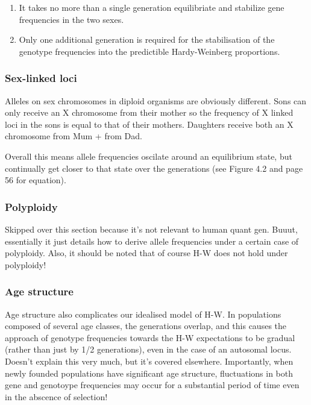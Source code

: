 \documentclass[
]{article}
\providecommand{\tightlist}{%
  \setlength{\itemsep}{0pt}\setlength{\parskip}{0pt}}
\begin{document}
\begin{enumerate}
\def\labelenumi{\arabic{enumi}.}
\tightlist
\item
  It takes no more than a single generation equilibriate and stabilize
  gene frequencies in the two sexes.
\item
  Only one additional generation is required for the stabilisation of
  the genotype frequencies into the predictible Hardy-Weinberg
  proportions.
\end{enumerate}

\hypertarget{sex-linked-loci}{%
\subsubsection{Sex-linked loci}\label{sex-linked-loci}}

Alleles on sex chromosomes in diploid organisms are obviously different.
Sons can only receive an X chromosome from their mother so the frequency
of X linked loci in the sons is equal to that of their mothers.
Daughters receive both an X chromosome from Mum + from Dad.

Overall this means allele frequencies oscilate around an equilibrium
state, but continually get closer to that state over the generations
(see Figure 4.2 and page 56 for equation).

\hypertarget{polyploidy}{%
\subsubsection{Polyploidy}\label{polyploidy}}

Skipped over this section because it's not relevant to human quant gen.
Buuut, essentially it just details how to derive allele frequencies
under a certain case of polyploidy. Also, it should be noted that of
course H-W does not hold under polyploidy!

\hypertarget{age-structure}{%
\subsubsection{Age structure}\label{age-structure}}

Age structure also complicates our idealised model of H-W. In
populations composed of several age classes, the generations overlap,
and this causes the approach of genotype frequencies towards the H-W
expectations to be gradual (rather than just by 1/2 generations), even
in the case of an autosomal locus. Doesn't explain this very much, but
it's covered elsewhere. Importantly, when newly founded populations have
significant age structure, fluctuations in both gene and genotoype
frequencies may occur for a substantial period of time even in the
abscence of selection!
\end{document}
